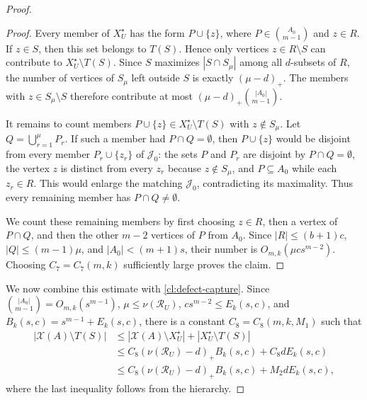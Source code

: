 \documentclass[10pt,a4paper]{article}
\numberwithin{equation}{section}
\theoremstyle{definition}
\newcommand{\X}{\mathcal X}
\newcommand{\Rcal}{\mathcal R}
\begin{document}
\begin{proof}
        \begin{proof}
                Every member of $X_U^\star$ has the form $P\cup\{z\}$,
                where $P\in\binom{A_0}{m-1}$ and $z\in R$.
                If $z\in S$, then this set belongs to $T(S)$.
                Hence only vertices $z\in R\setminus S$ can contribute to
                $X_U^\star\setminus T(S)$.
                Since $S$ maximizes $|S\cap S_\mu|$ among all
                $d$-subsets of $R$, the number of vertices of $S_\mu$
                left outside $S$ is exactly $(\mu-d)_+$.
                The members with $z\in S_\mu\setminus S$ therefore
                contribute at most $(\mu-d)_+\binom{|A_0|}{m-1}$.

                It remains to count members
                $P\cup\{z\}\in X_U^\star\setminus T(S)$ with
                $z\notin S_\mu$.
                Let $Q=\bigcup_{r=1}^{\mu}P_r$.
                If such a member had $P\cap Q=\emptyset$, then
                $P\cup\{z\}$ would be disjoint from every member
                $P_r\cup\{z_r\}$ of $\mathcal J_0$: the sets $P$ and
                $P_r$ are disjoint by $P\cap Q=\emptyset$, the vertex
                $z$ is distinct from every $z_r$ because $z\notin S_\mu$,
                and $P\subseteq A_0$ while each $z_r\in R$.
                This would enlarge the matching $\mathcal J_0$,
                contradicting its maximality.
                Thus every remaining member has $P\cap Q\ne\emptyset$.

                We count these remaining members by first choosing
                $z\in R$, then a vertex of $P\cap Q$, and then the other
                $m-2$ vertices of $P$ from $A_0$.
                Since $|R|\le(b+1)c$, $|Q|\le(m-1)\mu$, and
                $|A_0|<(m+1)s$, their number is
                $O_{m,k}(\mu cs^{m-2})$.  Choosing $C_7=C_7(m,k)$
                sufficiently large proves the claim.
        \end{proof}

        We now combine this estimate with \cref{cl:defect-capture}.
        Since $\binom{|A_0|}{m-1}=O_{m,k}(s^{m-1})$,
        $\mu\le\nu(\Rcal_U)$, $cs^{m-2}\le E_k(s,c)$, and
        $B_k(s,c)=s^{m-1}+E_k(s,c)$, there is a constant
        $C_8=C_8(m,k,M_1)$ such that
        \[
                \begin{aligned}
                        |\X(A)\setminus T(S)|
                         & \le
                        |\X(A)\setminus X_U^\star|
                        +|X_U^\star\setminus T(S)| \\
                         & \le
                        C_8(\nu(\Rcal_U)-d)_+B_k(s,c)
                        +C_8dE_k(s,c)              \\
                         & \le
                        C_8(\nu(\Rcal_U)-d)_+B_k(s,c)
                        +M_2dE_k(s,c),
                \end{aligned}
        \]
        where the last inequality follows from the hierarchy.


\end{proof}
\end{document}
